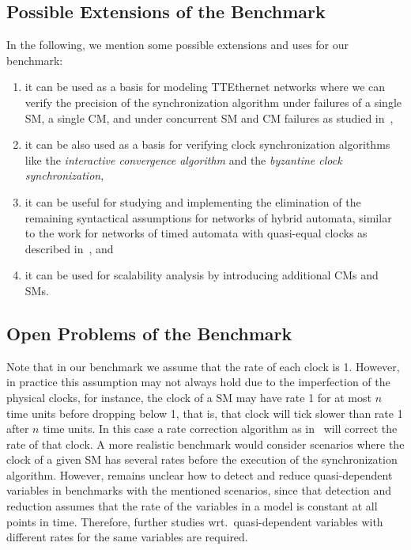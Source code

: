 \subsection{Possible Extensions of the Benchmark}

In the following, we mention some possible extensions and uses for our benchmark:
\begin{enumerate} 
\item it can be used as a basis for modeling TTEthernet networks where we can verify the
precision of the synchronization algorithm under failures of a single SM, a single CM, and
under concurrent SM and CM failures as studied in~\cite{Steiner2},   
\item it can be also used as a basis for verifying 
clock synchronization algorithms like the \emph{interactive convergence algorithm}\cite{lamport}
and the \emph{byzantine clock synchronization}\cite{lamport},
\item it can be useful for studying
and implementing the elimination of the remaining syntactical assumptions for
networks of hybrid automata, similar to the work for networks of timed automata 
with quasi-equal clocks as described in~\cite{Herrera4}, and
\item  it can be used for scalability analysis 
by introducing additional CMs and SMs.
\end{enumerate} 

\subsection{Open Problems of the Benchmark}
Note that in our benchmark we assume that the rate of each clock is 1. However, in practice this assumption
may not always hold due to the imperfection of the physical clocks, for instance, the clock of a SM may have 
rate 1 for at most $n$ time units before dropping below 1, that is, that clock will tick slower than rate 1 after $n$ time units.
In this case a rate correction algorithm as in~\cite{Steiner3} will correct the rate of that clock. 
A more realistic benchmark would consider scenarios where the clock of a given SM has several rates before the execution
of the synchronization algorithm. However, remains unclear how to detect and reduce quasi-dependent variables in benchmarks with
the mentioned scenarios, since that detection and reduction assumes that the rate of the variables in a model is constant at all points in time. Therefore, further studies wrt.\ quasi-dependent variables with different rates for the same variables are required.      
 
